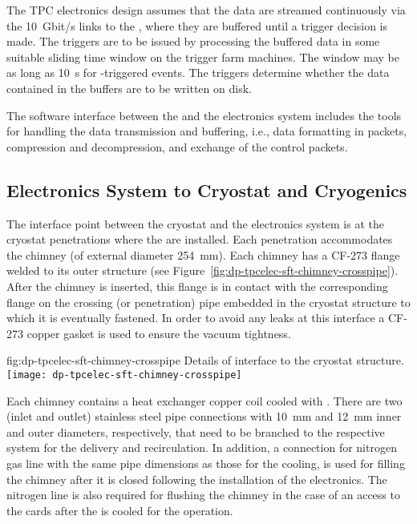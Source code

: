 The TPC electronics design assumes that the data are streamed continuously via the \SI{10}{Gbit/s} links to the , where they are buffered until a trigger decision is made. The triggers are to be issued by processing the buffered data in some suitable sliding time window on the trigger farm machines. The window may be as long as \SI{10}{s} for -triggered events. The triggers determine whether the data contained in the buffers are to be written on disk. 

The software interface between the  and the electronics system includes the tools for handling the data transmission and buffering, i.e.,  data formatting in  packets, compression and decompression, and exchange of the control packets.

\subsection{Electronics System to Cryostat and Cryogenics}
\label{ssec:dp-tpcelec-intfc-cryo}

The interface point between the cryostat and the \dual electronics system is at the cryostat penetrations where the  are installed. Each penetration accommodates the chimney (of external diameter \SI{254}{\mm}). Each chimney has a CF-273 flange welded to its outer structure (see Figure~\ref{fig:dp-tpcelec-sft-chimney-crosspipe}). After the chimney is inserted, this flange is in contact with the corresponding flange on the crossing (or penetration) pipe embedded in the cryostat structure to which it is eventually fastened. In order to avoid any leaks at this interface a CF-273 copper gasket is used to ensure the vacuum tightness.  

\begin{dunefigure}{fig:dp-tpcelec-sft-chimney-crosspipe}
{Details of  interface to the cryostat structure.}
\texttt{[image: dp-tpcelec-sft-chimney-crosspipe]}
\end{dunefigure}

Each chimney contains a heat exchanger copper coil cooled with \lar. There are two (inlet and outlet) stainless steel pipe connections with \SI{10}{\mm} and \SI{12}{\mm} inner and outer diameters, respectively, that need to be branched to the respective system for the \lar delivery and recirculation. In addition, a connection for nitrogen gas line with the same pipe dimensions as those for the \lar cooling, is used for filling the chimney after it is closed following the installation of the  electronics. The nitrogen line is also required for flushing the chimney in the case of an access to the  cards after the  is cooled for the operation. 

